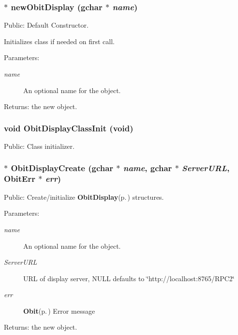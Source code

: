 \subsubsection{$\ast$ new\-Obit\-Display (gchar $\ast$ {\em name})}\label{ObitDisplay_8h_a14}


Public: Default Constructor. 

Initializes class if needed on first call. \begin{Desc}
\item[Parameters:]
\begin{description}
\item[{\em name}]An optional name for the object. \end{description}
\end{Desc}
\begin{Desc}
\item[Returns:]the new object. \end{Desc}
\subsubsection{\setlength{\rightskip}{0pt plus 5cm}void Obit\-Display\-Class\-Init (void)}\label{ObitDisplay_8h_a13}


Public: Class initializer. 

\subsubsection{$\ast$ Obit\-Display\-Create (gchar $\ast$ {\em name}, gchar $\ast$ {\em Server\-URL}, {\bf Obit\-Err} $\ast$ {\em err})}\label{ObitDisplay_8h_a15}


Public: Create/initialize {\bf Obit\-Display}{\rm (p.\,\pageref{structObitDisplay})} structures. 

\begin{Desc}
\item[Parameters:]
\begin{description}
\item[{\em name}]An optional name for the object. \item[{\em Server\-URL}]URL of display server, NULL defaults to \char`\"{}http://localhost:8765/RPC2\char`\"{} \item[{\em err}]{\bf Obit}{\rm (p.\,\pageref{structObit})} Error message \end{description}
\end{Desc}
\begin{Desc}
\item[Returns:]the new object. \end{Desc}
